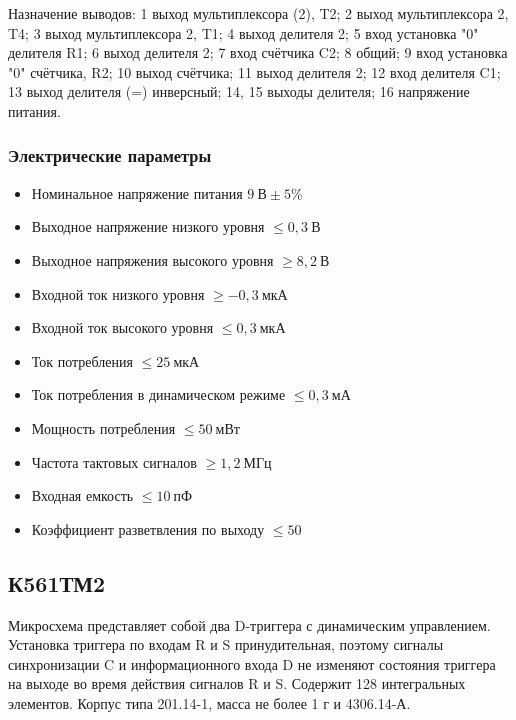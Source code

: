 Назначение выводов: 1 \longndash выход мультиплексора (2), T2; 2 \longndash выход мультиплексора 2, T4; 3 \longndash выход мультиплексора 2, T1; 4 \longndash выход делителя 2; 5 \longndash вход установка "0" делителя R1; 6 \longndash выход делителя 2; 7 \longndash вход счётчика C2; 8 \longndash общий; 9 \longndash вход установка "0" счётчика, R2; 10 \longndash выход счётчика; 11 \longndash выход делителя 2; 12 \longndash вход делителя C1; 13 \longndash выход делителя (=) инверсный; 14, 15 \longndash выходы делителя; 16 \longndash напряжение питания.

\subsubsection*{Электрические параметры}
\begin{itemize}
	\item[] Номинальное напряжение питания \dotfill $9~\text{В} \pm 5\%$
	\item[] Выходное напряжение низкого уровня \dotfill $\leq 0,3~\text{В}$
	\item[] Выходное напряжения высокого уровня \dotfill $\geq 8,2~\text{В}$
	\item[] Входной ток низкого уровня \dotfill $\geq -0,3~\text{мкА}$
	\item[] Входной ток высокого уровня \dotfill $\leq 0,3~\text{мкА}$
	\item[] Ток потребления \dotfill $\leq 25~\text{мкА}$
	\item[] Ток потребления в динамическом режиме \dotfill $\leq 0,3~\text{мА}$
	\item[] Мощность потребления \dotfill $\leq 50~\text{мВт}$
	\item[] Частота тактовых сигналов \dotfill $\geq 1,2~\text{МГц}$
	\item[] Входная емкость \dotfill $\leq 10~\text{пФ}$
	\item[] Коэффициент разветвления по выходу \dotfill $\leq 50$
\end{itemize}

\subsection*{К561ТМ2}

Микросхема представляет собой два D-триггера с динамическим управлением. Установка триггера по входам R и S принудительная, поэтому сигналы синхронизации C и информационного входа D не изменяют состояния триггера на выходе во время действия сигналов R и S. Содержит 128 интегральных элементов. Корпус типа 201.14-1, масса не более 1 г и 4306.14-А.

